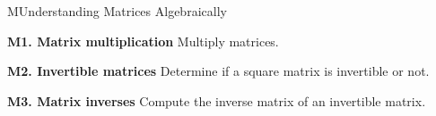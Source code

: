 
\begin{module}{M}{Understanding Matrices Algebraically}

\begin{moduleStandards}
  \item \textbf{M1. Matrix multiplication}
         Multiply matrices.
  \item \textbf{M2. Invertible matrices}
        Determine if a square matrix is invertible or not.
  \item \textbf{M3. Matrix inverses}
        Compute the inverse matrix of an invertible matrix.
\end{moduleStandards}







\end{module}
